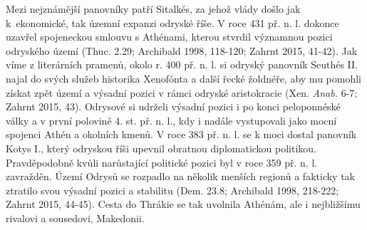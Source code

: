 Mezi nejznámější panovníky patří Sitalkés, za jehož vlády došlo jak k~ekonomické, tak územní expanzi odryské říše. V roce 431 př. n. l. dokonce uzavřel spojeneckou smlouvu s Athénami, kterou stvrdil významnou pozici odryského území (Thuc. 2.29; Archibald 1998, 118-120; Zahrnt 2015, 41-42). Jak víme z literárních pramenů, okolo r. 400 př. n. l. si odryský panovník Seuthés II. najal do svých služeb historika Xenofónta a další řecké žoldnéře, aby mu pomohli získat zpět území a výsadní pozici v rámci odryské aristokracie (Xen. {\em Anab.} 6-7; Zahrnt 2015, 43). Odrysové si udrželi výsadní pozici i po konci peloponnéské války a v první polovině 4. st. př. n. l., kdy i nadále vystupovali jako mocní spojenci Athén a okolních kmenů. V roce 383 př. n. l. se k moci dostal panovník Kotys I., který odryskou říši upevnil obratnou diplomatickou politikou. Pravděpodobně kvůli narůstající politické pozici byl v roce 359 př. n. l. zavražděn. Území Odrysů se rozpadlo na několik menších regionů a fakticky tak ztratilo svou výsadní pozici a stabilitu (Dem. 23.8; Archibald 1998, 218-222; Zahrnt 2015, 44-45). Cesta do Thrákie se tak uvolnila Athénám, ale i nejbližšímu rivalovi a sousedovi, Makedonii.

